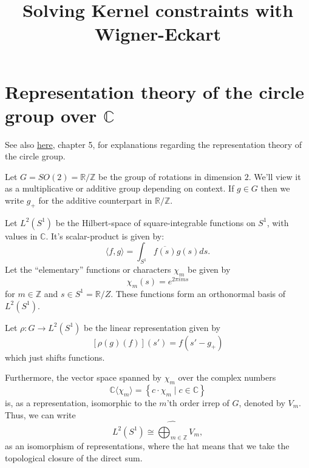 \documentclass[12pt, a4paper]{article}
\title{Solving Kernel constraints with Wigner-Eckart}
\date{}
\theoremstyle{plain}
\theoremstyle{definition}
\theoremstyle{remark}
\newcommand{\Z}{\mathds{Z}}
\newcommand{\R}{\mathds{R}}
\newcommand{\C}{\mathds{C}}
\begin{document}
\maketitle

\tableofcontents

\section{Representation theory of the circle group over $\C$}

See also \href{https://www.google.de/url?sa=t&rct=j&q=&esrc=s&source=web&cd=2&ved=2ahUKEwjmqryykejnAhVCjqQKHelWD64QFjABegQIBhAB&url=https%3A%2F%2Fpeople.math.ethz.ch%2F~kowalski%2Frepresentation-theory.pdf&usg=AOvVaw26KQERYwYqIMiDaXbxsZ8U}{here}, chapter 5, for explanations regarding the representation theory of the circle group.

Let $G = SO(2) = \R/\Z$ be the group of rotations in dimension $2$. We'll view it as a multiplicative or additive group depending on context. If $g \in G$ then we write $g_+$ for the additive counterpart in $\R/\Z$.

Let $L^2(S^1)$ be the Hilbert-space of square-integrable functions on $S^1$, with values in $\C$. It's scalar-product is given by:
\begin{equation*}
\langle f, g \rangle = \int_{S^1} \overline{f(s)} g(s) ds.
\end{equation*}
Let the ``elementary'' functions or characters $\chi_m$ be given by
\begin{equation*}
\chi_m(s) = e^{2 \pi i m s}
\end{equation*}
for $m \in \Z$ and $s \in S^1 = \R/Z$. These functions form an orthonormal basis of $L^2(S^1)$. 

Let $\rho: G \to L^2(S^1)$ be the linear representation given by
\begin{equation*}
\left[\rho(g)(f)\right](s') = f(s' - g_{+})
\end{equation*}
which just shifts functions. 

Furthermore, the vector space spanned by $\chi_m$ over the complex numbers
\begin{equation*}
\C\langle \chi_m\rangle = \left\lbrace c \cdot \chi_m \mid c \in \C \right\rbrace
\end{equation*}
is, as a representation, isomorphic to the $m$'th order irrep of $G$, denoted by $V_m$. Thus, we can write
\begin{equation*}
L^2(S^1) \cong \widehat{\bigoplus_{m \in \Z}} V_m,
\end{equation*}
as an isomorphism of representations, where the hat means that we take the topological closure of the direct sum.
\end{document}
